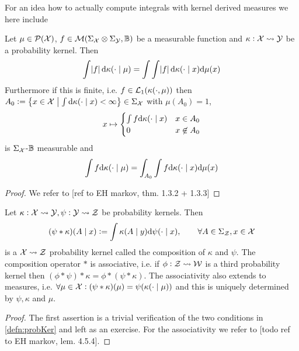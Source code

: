 \documentclass{article}
\begin{document}
For an idea how to actually compute integrals with kernel derived measures
we here include
\begin{thm}
  Let $\mu \in \mathcal{P}(\mathcal{X})$,
  $f \in \mathcal{M}(\Sigma_\mathcal{X} \otimes \Sigma_\mathcal{Y}, \mathbb{B})$
  be a measurable function and
  $\kappa : \mathcal{X} \leadsto \mathcal{Y}$ be a probability kernel.
  Then
  \[ \int \abs{f} \mathrm{d} \kappa(\cdot \mid \mu)
  = \int \int \abs{f} \mathrm{d} \kappa(\cdot \mid x) \mathrm{d} \mu(x) \]
  Furthermore if this is finite, i.e. $f \in \mathcal{L}_1(\kappa(\cdot, \mu))$
  then $A_0 \vcentcolon= \left\{ x \in \mathcal{X} \;\middle\vert\;
    \int \mathrm{d} \kappa(\cdot \mid x) < \infty \right\}
  \in \Sigma_\mathcal{X}$
  with $\mu(A_0) = 1$, 
  \[ x \mapsto \begin{cases}
      \int f \mathrm{d} \kappa(\cdot \mid x) & x \in A_0
      \\ 0 & x \not\in A_0
  \end{cases} \]
  is $\Sigma_\mathcal{X}$-$\mathbb{B}$ measurable and
  \[ \int f \mathrm{d} \kappa(\cdot \mid \mu)
  = \int_{A_0} \int f \mathrm{d} \kappa(\cdot \mid x) \mathrm{d} \mu(x) \]  
  \label{thm:extTonFub}
\end{thm}
\begin{proof}
  We refer to [ref to EH markov, thm. 1.3.2 + 1.3.3]
\end{proof}

\begin{prop}
  Let $\kappa : \mathcal{X} \leadsto \mathcal{Y}, \psi : \mathcal{Y} \leadsto \mathcal{Z}$
  be probability kernels. Then
  \[ (\psi * \kappa)(A \mid x) \vcentcolon=
    \int \kappa(A \mid y) \mathrm{d} \psi(\cdot \mid x)
  ,\qquad \forall A \in \Sigma_{\mathcal{Z}}, x \in \mathcal{X} \]
  is a $\mathcal{X} \leadsto \mathcal{Z}$ probability kernel called the
  composition of $\kappa$ and $\psi$. The composition operator
  $*$ is associative, i.e. if $\phi : \mathcal{Z} \leadsto \mathcal{W}$ is
  a third probability kernel then $(\phi * \psi) * \kappa = 
  \phi * (\psi * \kappa)$.
  The associativity also extends to measures, i.e.
  $\forall \mu \in \mathcal{X}
  : (\psi * \kappa)(\mu) = \psi(\kappa(\cdot \mid \mu)) $
  and this is uniquely determined by $\psi, \kappa$ and $\mu$.
  \label{prop:compKer}
\end{prop}
\begin{proof}
  The first assertion is a trivial verification of the two conditions
  in \cref{defn:probKer} and left as an exercise.
  For the associativity we refer to [todo ref to EH markov, lem. 4.5.4].
\end{proof}
\end{document}
